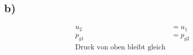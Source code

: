 

\subsection*{b)}
\begin{align*}
    u_2 &= u_1 \\
    p_{g1} &= p_{g2} \\
    \text{Druck von oben bleibt gleich}
\end{align*}